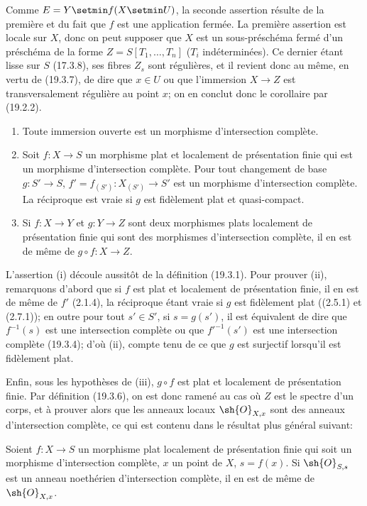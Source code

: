 Comme $E=Y\setmin f(X\setmin U)$, la seconde assertion résulte de la première et du fait que $f$ est une application fermée. La première assertion est locale sur $X$, donc on peut supposer que $X$ est un sous-préschéma fermé d'un préschéma de la forme $Z=S[T_1,\ldots,T_n]$ ($T_i$ indéterminées). Ce dernier étant lisse sur $S$ (17.3.8), ses fibres $Z_s$ sont régulières, et il revient donc au même, en vertu de (19.3.7), de dire que $x\in U$ ou que l'immersion $X\to Z$ est transversalement régulière au point $x$; on en conclut donc le corollaire par (19.2.2).

\begin{proposition}[19.3.9]
\label{IV.19.3.9}
\begin{enumerate}
  \item[\textup{(i)}] Toute immersion ouverte est un morphisme d'intersection complète.
  \item[\textup{(ii)}] Soit $f:X\to S$ un morphisme plat et localement de présentation finie qui est un morphisme d'intersection complète. Pour tout changement de base $g:S'\to S$, $f'=f_{(S')}:X_{(S')}\to S'$ est un morphisme d'intersection complète. La réciproque est vraie si $g$ est fidèlement plat et quasi-compact.
  \item[\textup{(iii)}] Si $f:X\to Y$ et $g:Y\to Z$ sont deux morphismes plats localement de présentation finie qui sont des morphismes d'intersection complète, il en est de même de $g\circ f:X\to Z$.
\end{enumerate}
\end{proposition}

L'assertion (i) découle aussitôt de la définition (19.3.1). Pour prouver (ii), remarquons d'abord que si $f$ est plat et localement de présentation finie, il en est de
même de $f'$ (2.1.4), la réciproque étant vraie si $g$ est fidèlement plat ((2.5.1) et (2.7.1)); en outre pour tout $s'\in S'$, si $s=g(s')$, il est équivalent de dire que $f^{-1}(s)$ est une intersection complète ou que $f'^{-1}(s')$ est une intersection complète (19.3.4); d'où (ii), compte tenu de ce que $g$ est surjectif lorsqu'il est fidèlement plat.

Enfin, sous les hypothèses de (iii), $g\circ f$ est plat et localement de présentation finie. Par définition (19.3.6), on est donc ramené au cas où $Z$ est le spectre d'un corps, et à prouver alors que les anneaux locaux $\sh{O}_{X,x}$ sont des anneaux d'intersection complète, ce qui est contenu dans le résultat plus général suivant:

\begin{corollary}[19.3.10]
\label{IV.19.3.10}
Soient $f:X\to S$ un morphisme plat localement de présentation finie qui soit un morphisme d'intersection complète, $x$ un point de $X$, $s=f(x)$. Si $\sh{O}_{S,s}$ est un anneau noethérien d'intersection complète, il en est de même de $\sh{O}_{X,x}$.
\end{corollary}


